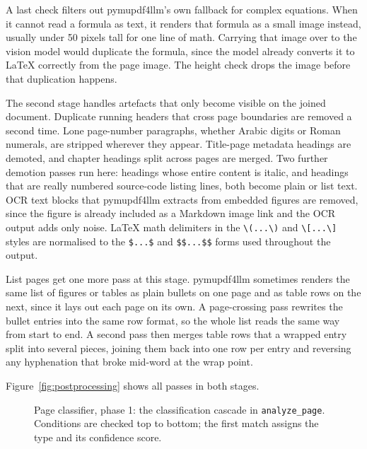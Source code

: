 A last check filters out pymupdf4llm's own fallback for complex equations.
When it cannot read a formula as text, it renders that formula as a small image instead, usually under 50 pixels tall for one line of math.
Carrying that image over to the vision model would duplicate the formula, since the model already converts it to \LaTeX{} correctly from the page image.
The height check drops the image before that duplication happens.

The second stage handles artefacts that only become visible on the joined document.
Duplicate running headers that cross page boundaries are removed a second time.
Lone page-number paragraphs, whether Arabic digits or Roman numerals, are stripped wherever they appear.
Title-page metadata headings are demoted, and chapter headings split across pages are merged.
Two further demotion passes run here: headings whose entire content is italic, and headings that are really numbered source-code listing lines, both become plain or list text.
OCR text blocks that pymupdf4llm extracts from embedded figures are removed, since the figure is already included as a Markdown image link and the OCR output adds only noise.
LaTeX math delimiters in the \texttt{\textbackslash(...\textbackslash)} and \texttt{\textbackslash[...\textbackslash]} styles are normalised to the \texttt{\$...\$} and \texttt{\$\$...\$\$} forms used throughout the output.

List pages get one more pass at this stage.
pymupdf4llm sometimes renders the same list of figures or tables as plain bullets on one page and as table rows on the next, since it lays out each page on its own.
A page-crossing pass rewrites the bullet entries into the same row format, so the whole list reads the same way from start to end.
A second pass then merges table rows that a wrapped entry split into several pieces, joining them back into one row per entry and reversing any hyphenation that broke mid-word at the wrap point.

Figure~\ref{fig:postprocessing} shows all passes in both stages.

\begin{figure}[H]
    \centering
    
    \caption[Page classifier, phase 1: the classification cascade]{Page classifier, phase 1: the classification cascade in \texttt{analyze\_page}. Conditions are checked top to bottom; the first match assigns the type and its confidence score.}
    \label{fig:classifier}
\end{figure}

